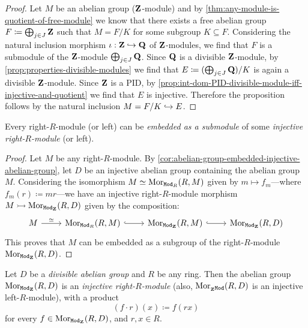 \begin{proof}
    Let \(M\) be an abelian group (\(\mathbf{Z}\)-module) and by
    \cref{thm:any-module-is-quotient-of-free-module} we know that there exists a
    free abelian group \(F \coloneq \bigoplus_{j \in J} \mathbf{Z}\) such that \(M = F/K\)
    for some subgroup \(K \subseteq F\). Considering the natural inclusion morphism
    \(\iota: \mathbf{Z} \hookrightarrow \mathbf{Q}\) of \(\mathbf{Z}\)-modules, we find that \(F\) is a submodule of
    the \(\mathbf{Z}\)-module \(\bigoplus_{j \in J} \mathbf{Q}\). Since \(\mathbf{Q}\) is a divisible
    \(\mathbf{Z}\)-module, by \cref{prop:properties-divisible-modules} we find that
    \(E \coloneq (\bigoplus_{j \in J} \mathbf{Q})/K\) is again a divisible
    \(\mathbf{Z}\)-module. Since \(\mathbf{Z}\) is a PID, by
    \cref{prop:int-dom-PID-divisible-module-iff-injective-and-quotient} we find that
    \(E\) is injective. Therefore the proposition follows by the natural inclusion
    \(M = F/K \hookrightarrow E\).
\end{proof}

\begin{theorem}
    \label{thm:module-embedded-injective-module}
    Every right-\(R\)-module (or left) can be \emph{embedded as a submodule} of some
    \emph{injective right-\(R\)-module} (or left).
\end{theorem}

\begin{proof}
    Let \(M\) be any right-\(R\)-module. By
    \cref{cor:abelian-group-embedded-injective-abelian-group}, let \(D\) be an
    injective abelian group containing the abelian group \(M\). Considering the
    isomorphism \(M \simeq \operatorname{Mor}_{{\texttt{Mod}_{R}}}(R, M)\) given by \(m \mapsto f_m\)---where
    \(f_m(r) \coloneq m r\)---we have an injective right-\(R\)-module morphism
    \(M \rightarrowtail \operatorname{Mor}_{{\texttt{Mod}_{\mathbf{Z}}}}(R, D)\) given by the composition:
    \[
        \begin{tikzcd}
            M \ar[r, "\dis"] &\Hom_{\rMod{R}}(R, M) \ar[r, hook]
            &\Hom_{\rMod{\Z}}(R, M) \ar[r, hook]
            &\Hom_{\rMod{\Z}}(R, D)
        \end{tikzcd}
    \]
    This proves that \(M\) can be embedded as a subgroup of the right-\(R\)-module
    \(\operatorname{Mor}_{{\texttt{Mod}_{\mathbf{Z}}}}(R, D)\).
\end{proof}

\begin{proposition}
    \label{prop:abelian-grp-divisible-then-MorR-D-injective}
    Let \(D\) be a \emph{divisible abelian group} and \(R\) be any ring. Then the
    abelian group \(\operatorname{Mor}_{{\texttt{Mod}_{\mathbf{Z}}}}(R, D)\) is an \emph{injective
        right-\(R\)-module} (also, \(\operatorname{Mor}_{{{}_{\mathbf{Z}}\texttt{Mod}}}(R, D)\) is an injective
    left-\(R\)-module), with a product
    \[
        (f \cdot r)(x) \coloneq f(r x)
    \]
    for every \(f \in \operatorname{Mor}_{{\texttt{Mod}_{\mathbf{Z}}}}(R, D)\), and \(r, x \in R\).
\end{proposition}

